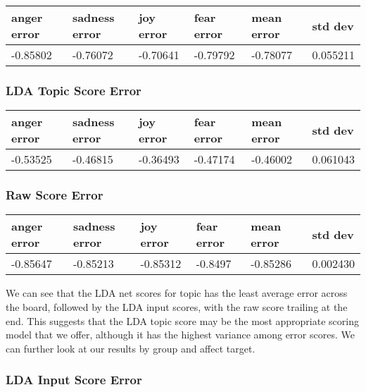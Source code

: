 \documentclass[11pt, twoside, reqno]{book}
\begin{document}
\begin{table}[h!]
    \raggedright
    \begin{tabular}{|l|l|l|l|l|l|}
    \hline
        anger error & sadness error & joy error & fear error & mean error & std dev \\ \hline
        -0.85802 & -0.76072 & -0.70641 & -0.79792 & -0.78077 & 0.055211 \\ \hline
    \end{tabular}
\end{table}

\subsubsection{\textbf{LDA Topic Score Error}}

\begin{table}[h!]
    \raggedright
    \begin{tabular}{|l|l|l|l|l|l|}
    \hline
        anger error & sadness error & joy error & fear error & mean error & std dev \\ \hline
        -0.53525 & -0.46815 & -0.36493 & -0.47174 & -0.46002 & 0.061043 \\ \hline
    \end{tabular}
\end{table}

\subsubsection{\textbf{Raw Score Error}}
\begin{table}[h!]
    \raggedright
    \begin{tabular}{|l|l|l|l|l|l|}
    \hline
        anger error & sadness error & joy error & fear error & mean error & std dev \\ \hline
        -0.85647 & -0.85213 & -0.85312 & -0.8497 & -0.85286 & 0.002430 \\ \hline
    \end{tabular}
\end{table}

We can see that the LDA net scores for topic has the least average error across the board, followed by the LDA input scores, with the raw score trailing at the end. This suggests that the LDA topic score may be the most appropriate scoring model that we offer, although it has the highest variance among error scores. We can further look at our results by group and affect target.

\subsubsection{\textbf{LDA Input Score Error}}
\end{document}
